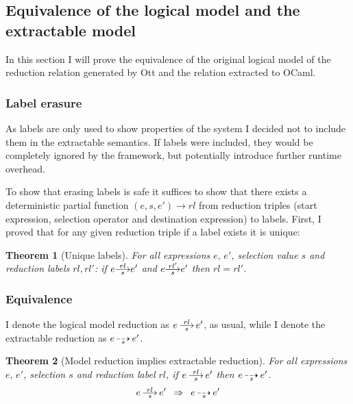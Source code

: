 \documentclass[12pt,twoside,notitlepage]{report}
\newcommand{\red}[2]{\stackon[.05ex]{\stackunder[-0.05ex]{$\longrightarrow$}{$\scriptstyle #1$}}{$\scriptstyle #2$}}
\newcommand{\xred}[1]{\stackunder[-0.05ex]{$\dashrightarrow$}{$\scriptstyle #1$}}
\theoremstyle{plain}%
\newtheorem{thm}{Theorem}[section]
\theoremstyle{definition}
\theoremstyle{remark}
\begin{document}
\subsection{Equivalence of the logical model and the extractable model}
In this section I will prove the equivalence of the original logical model of the reduction relation generated by Ott and the relation extracted to OCaml.
\subsubsection{Label erasure}
As labels are only used to show properties of the system I decided not to include them in the extractable semantics. If labels were included, they would be completely ignored by the framework, but potentially introduce further runtime overhead.

To show that erasing labels is safe it suffices to show that there exists a deterministic partial function $ (e,s,e') \rightarrow rl $ from reduction triples (start expression, selection operator and destination expression) to labels. First, I proved that for any given reduction triple if a label exists it is unique:
\begin{thm}[Unique labels]
\label{thm:unique_label}
For all expressions $ e,\, e'$, selection value $ s $ and reduction labels $ rl, rl' $:
 if $ e \red{s}{rl}e' $ and $ e \red{s}{rl'}e' $ then $ rl = rl' $. 
\end{thm}
\subsubsection{Equivalence}
I denote the logical model reduction as $ e\, \red{s}{rl}\, e' $, as usual, while I denote the extractable reduction as $ e\, \xred{s}\, e' $.

\begin{thm}[Model reduction implies extractable reduction]
\label{thm:jo_to_xjo}
For all expressions $ e,\,e' $, selection $ s $ and reduction label $ rl $, if $ e\, \red{s}{rl}\, e' $ then $  e\, \xred{s}\, e' $.
\[  e\, \red{s}{rl}\, e' \,\,\,\Rightarrow \,\,\, e\, \xred{s}\, e' \]
\end{thm}
\end{document}
